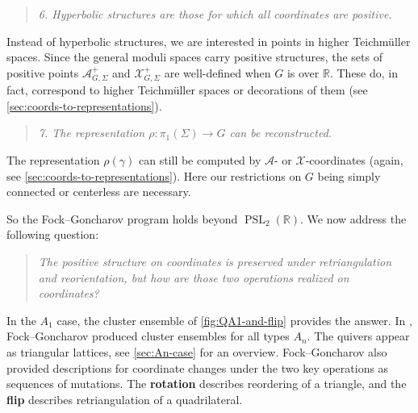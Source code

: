 \documentclass{amsart}
\theoremstyle{plain}
\theoremstyle{definition}
\theoremstyle{remark}
\newcommand{\defined}[1]{\textbf{#1}}
\DeclareMathOperator{\PSL}{PSL}
\begin{document}
  \begin{quote}
    \emph{6. Hyperbolic structures are those for which all coordinates
      are positive.}
  \end{quote}

  Instead of hyperbolic structures, we are interested in points in
  higher Teichmüller spaces. Since the general moduli spaces carry
  positive structures, the sets of positive points
  $\mathcal{A}^{+}_{G,\Sigma}$ and $\mathcal{X}^{+}_{G,\Sigma}$ are
  well-defined when $G$ is over $\mathbb{R}$. These do, in fact,
  correspond to higher Teichmüller spaces or decorations of them (see
  \cref{sec:coords-to-representations}).

  \begin{quote}
    \emph{7. The representation $\rho : \pi_1(\Sigma) \to G$ can be
      reconstructed.}
  \end{quote}

  The representation $\rho(\gamma)$ can still be computed by
  $\mathcal{A}$- or $\mathcal{X}$-coordinates (again, see
  \cref{sec:coords-to-representations}). Here our restrictions on $G$
  being simply connected or centerless are necessary.

  So the Fock--Goncharov program holds beyond $\PSL_2(\mathbb{R})$. We
  now address the following question:

  \begin{quote}
    \emph{The positive structure on coordinates is preserved under
      retriangulation and reorientation, but how are those two
      operations realized on coordinates?}
  \end{quote}

  In the $A_1$ case, the cluster ensemble of \cref{fig:QA1-and-flip}
  provides the answer. In \cite{fockgoncharov2006}, Fock--Goncharov
  produced cluster ensembles for all types $A_n$. The quivers appear as
  triangular lattices, see \cref{sec:An-case} for an overview.
  Fock--Goncharov also provided descriptions for coordinate changes
  under the two key operations as sequences of mutations. The
  \defined{rotation} describes reordering of a triangle, and the
  \defined{flip} describes retriangulation of a quadrilateral.
\end{document}
